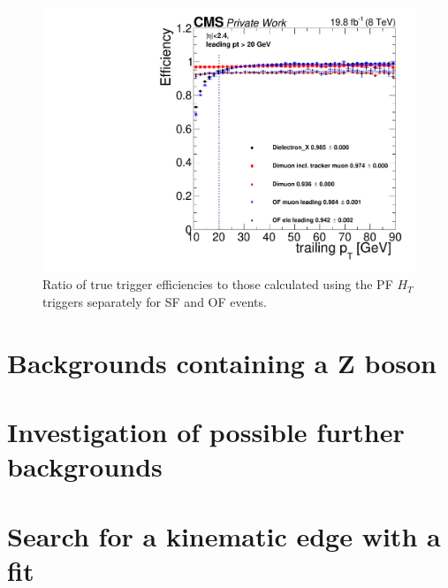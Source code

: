 \begin{figure}
\begin{center}
\includegraphics[scale=0.35]{plots/BG/trigger/Triggereff_Muon_Inclusive_Inclusive_Full2012_pt1_leadingPt20.pdf}
\caption{Ratio of true trigger efficiencies to those calculated using the PF $H_T$ triggers separately for SF and OF events.}
\label{fig:triggerEffBias}
\end{center}
\end{figure} 
\section{Backgrounds containing a Z boson}
\section{Investigation of possible further backgrounds}
\section{Search for a kinematic edge with a fit}

